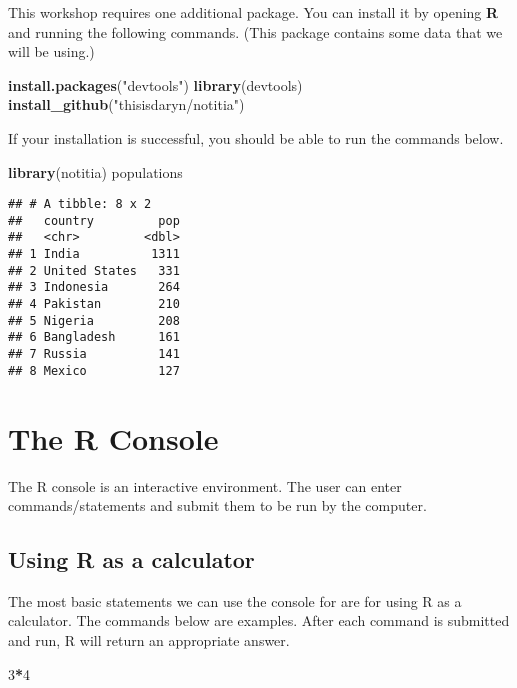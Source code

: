 \documentclass[]{book}
\newenvironment{Shaded}{\begin{snugshade}}{\end{snugshade}}
\newcommand{\DecValTok}[1]{\textcolor[rgb]{0.00,0.00,0.81}{#1}}
\newcommand{\KeywordTok}[1]{\textcolor[rgb]{0.13,0.29,0.53}{\textbf{#1}}}
\newcommand{\NormalTok}[1]{#1}
\newcommand{\OperatorTok}[1]{\textcolor[rgb]{0.81,0.36,0.00}{\textbf{#1}}}
\newcommand{\StringTok}[1]{\textcolor[rgb]{0.31,0.60,0.02}{#1}}
\begin{document}
This workshop requires one additional package. You can install it by opening \textbf{R} and running the following commands. (This package contains some data that we will be using.)

\begin{Shaded}
\begin{Highlighting}[]
\KeywordTok{install.packages}\NormalTok{(}\StringTok{"devtools"}\NormalTok{)}
\KeywordTok{library}\NormalTok{(devtools)}
\KeywordTok{install_github}\NormalTok{(}\StringTok{"thisisdaryn/notitia"}\NormalTok{)}
\end{Highlighting}
\end{Shaded}

If your installation is successful, you should be able to run the commands below.

\begin{Shaded}
\begin{Highlighting}[]
\KeywordTok{library}\NormalTok{(notitia)}
\NormalTok{populations}
\end{Highlighting}
\end{Shaded}

\begin{verbatim}
## # A tibble: 8 x 2
##   country         pop
##   <chr>         <dbl>
## 1 India          1311
## 2 United States   331
## 3 Indonesia       264
## 4 Pakistan        210
## 5 Nigeria         208
## 6 Bangladesh      161
## 7 Russia          141
## 8 Mexico          127
\end{verbatim}

\hypertarget{console}{%
\chapter{The R Console}\label{console}}

The R console is an interactive environment. The user can enter commands/statements and submit them to be run by the computer.

\hypertarget{rcalculator}{%
\section*{Using R as a calculator}\label{rcalculator}}

The most basic statements we can use the console for are for using R as a calculator. The commands below are examples. After each command is submitted and run, R will return an appropriate answer.

\begin{Shaded}
\begin{Highlighting}[]
\DecValTok{3}\OperatorTok{*}\DecValTok{4}
\end{Highlighting}
\end{Shaded}
\end{document}
